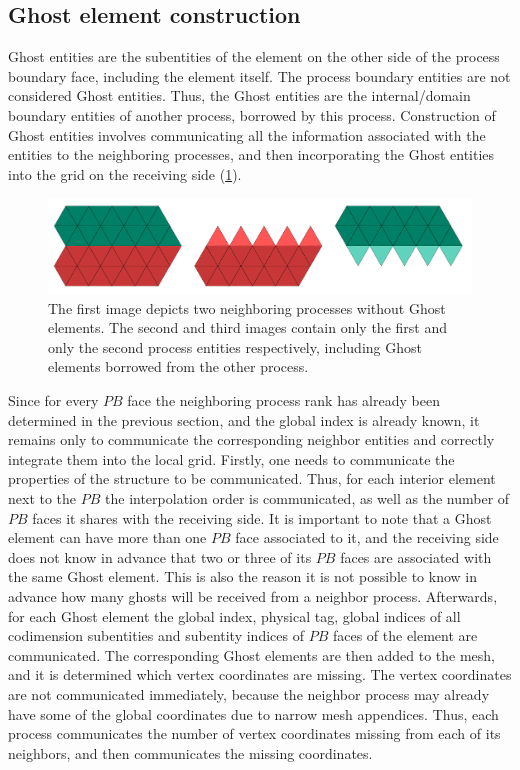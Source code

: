 \subsection{Ghost element construction}
\label{impl-grid-constructor-ghost}

\noindent
Ghost entities are the subentities of the element on the other side of the process boundary face, including the element itself. The process boundary entities are not considered Ghost entities. Thus, the Ghost entities are the internal/domain boundary entities of another process, borrowed by this process. Construction of Ghost entities involves communicating all the information associated with the entities to the neighboring processes, and then incorporating the Ghost entities into the grid on the receiving side (\cref{fig:impl:ghostelements}). \\

\begin{figure}
    \centering
	\includegraphics[scale=0.5]{images/parallel-ghost-elements}
	\caption{The first image depicts two neighboring processes without Ghost elements. The second and third images contain only the first and only the second process entities respectively, including Ghost elements borrowed from the other process. }
	\label{fig:impl:ghostelements}
\end{figure}

\noindent
Since for every $PB$ face the neighboring process rank has already been determined in the previous section, and the global index is already known, it remains only to communicate the corresponding neighbor entities and correctly integrate them into the local grid. Firstly, one needs to communicate the properties of the structure to be communicated. Thus, for each interior element next to the $PB$ the interpolation order is communicated, as well as the number of $PB$ faces it shares with the receiving side. It is important to note that a Ghost element can have more than one $PB$ face associated to it, and the receiving side does not know in advance that two or three of its $PB$ faces are associated with the same Ghost element. This is also the reason it is not possible to know in advance how many ghosts will be received from a neighbor process. Afterwards, for each Ghost element the global index, physical tag, global indices of all codimension subentities and subentity indices of $PB$ faces of the element are communicated. The corresponding Ghost elements are then added to the mesh, and it is determined which vertex coordinates are missing. The vertex coordinates are not communicated immediately, because the neighbor process may already have some of the global coordinates due to narrow mesh appendices. Thus, each process communicates the number of vertex coordinates missing from each of its neighbors, and then communicates the missing coordinates.





